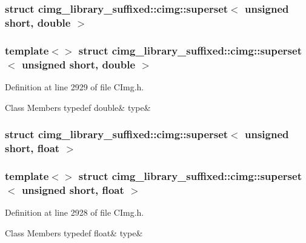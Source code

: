 \subsubsection{struct cimg\+\_\+library\+\_\+suffixed\+:\+:cimg\+:\+:superset$<$ unsigned short, double $>$}
\subsubsection*{template$<$$>$\newline
struct cimg\+\_\+library\+\_\+suffixed\+::cimg\+::superset$<$ unsigned short, double $>$}



Definition at line 2929 of file C\+Img.\+h.

\begin{DoxyFields}{Class Members}
\mbox{\label{namespacecimg__library__suffixed_1_1cimg_a1a36409119e78bbe2a8f8088444a0837}} 
typedef double&
type&
\\
\hline

\end{DoxyFields}
\label{structcimg__library__suffixed_1_1cimg_1_1superset_3_01unsigned_01short_00_01float_01_4}
\subsubsection{struct cimg\+\_\+library\+\_\+suffixed\+:\+:cimg\+:\+:superset$<$ unsigned short, float $>$}
\subsubsection*{template$<$$>$\newline
struct cimg\+\_\+library\+\_\+suffixed\+::cimg\+::superset$<$ unsigned short, float $>$}



Definition at line 2928 of file C\+Img.\+h.

\begin{DoxyFields}{Class Members}
\mbox{\label{namespacecimg__library__suffixed_1_1cimg_a7ca93ba84007cc6685b7a1a7da5ae333}} 
typedef float&
type&
\\
\hline

\end{DoxyFields}
\label{structcimg__library__suffixed_1_1cimg_1_1superset_3_01unsigned_01short_00_01int_01_4}
